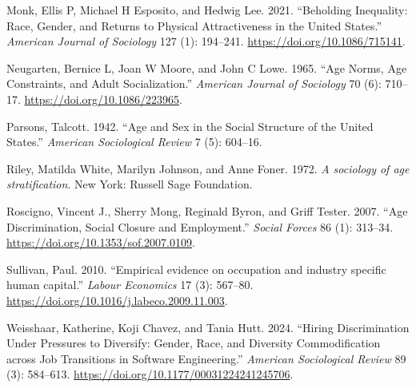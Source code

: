 \documentclass[
  letterpaper,
  DIV=11,
  numbers=noendperiod]{scrartcl}
\newlength{\cslhangindent}
\newlength{\cslentryspacingunit} %
\newenvironment{CSLReferences}[2] %
 {%
  \setlength{\parindent}{0pt}
  \ifodd #1
  \let\oldpar\par
  \def\par{\hangindent=\cslhangindent\oldpar}
  \fi
  \setlength{\parskip}{#2\cslentryspacingunit}
 }%
 {}
\theoremstyle{paper}
\begin{document}
\begin{CSLReferences}{1}{0}
\leavevmode{}%
Monk, Ellis P, Michael H Esposito, and Hedwig Lee. 2021. {``{Beholding
Inequality: Race, Gender, and Returns to Physical Attractiveness in the
United States}.''} \emph{American Journal of Sociology} 127 (1):
194--241. \url{https://doi.org/10.1086/715141}.

\leavevmode{}%
Neugarten, Bernice L, Joan W Moore, and John C Lowe. 1965. {``{Age
Norms, Age Constraints, and Adult Socialization}.''} \emph{American
Journal of Sociology} 70 (6): 710--17.
\url{https://doi.org/10.1086/223965}.

\leavevmode{}%
Parsons, Talcott. 1942. {``{Age and Sex in the Social Structure of the
United States}.''} \emph{American Sociological Review} 7 (5): 604--16.

\leavevmode{}%
Riley, Matilda White, Marilyn Johnson, and Anne Foner. 1972. \emph{{A
sociology of age stratification}}. New York: Russell Sage Foundation.

\leavevmode{}%
Roscigno, Vincent J., Sherry Mong, Reginald Byron, and Griff Tester.
2007. {``{Age Discrimination, Social Closure and Employment}.''}
\emph{Social Forces} 86 (1): 313--34.
\url{https://doi.org/10.1353/sof.2007.0109}.

\leavevmode{}%
Sullivan, Paul. 2010. {``{Empirical evidence on occupation and industry
specific human capital}.''} \emph{Labour Economics} 17 (3): 567--80.
\url{https://doi.org/10.1016/j.labeco.2009.11.003}.

\leavevmode{}%
Weisshaar, Katherine, Koji Chavez, and Tania Hutt. 2024. {``{Hiring
Discrimination Under Pressures to Diversify: Gender, Race, and Diversity
Commodification across Job Transitions in Software Engineering}.''}
\emph{American Sociological Review} 89 (3): 584--613.
\url{https://doi.org/10.1177/00031224241245706}.

\end{CSLReferences}
\end{document}
